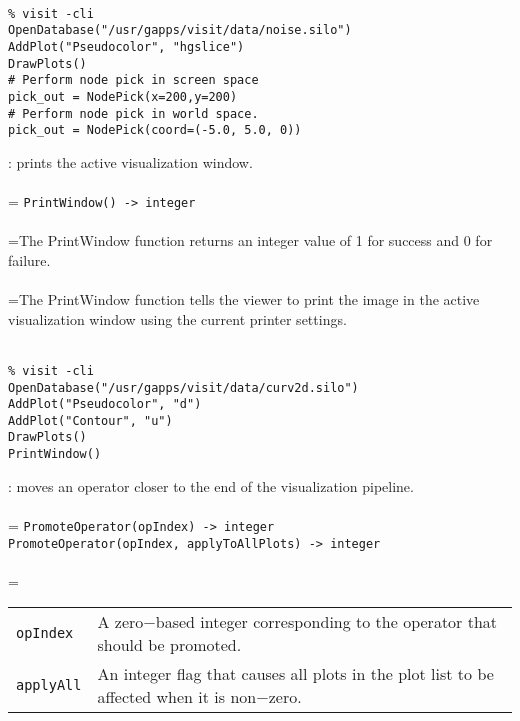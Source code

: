 \documentclass[10pt,a4paper]{report}
\begin{document}
\\[-6mm]
\begin{verbatim}% visit -cli
OpenDatabase("/usr/gapps/visit/data/noise.silo")
AddPlot("Pseudocolor", "hgslice")
DrawPlots()
# Perform node pick in screen space
pick_out = NodePick(x=200,y=200)
# Perform node pick in world space.
pick_out = NodePick(coord=(-5.0, 5.0, 0))
\end{verbatim}
\newpage


{}
: prints the active visualization window.\\[-3mm]

 \\ 
\hangindent=\parindent 
\verb!PrintWindow() -> integer!\\ [-3mm]

 \\ 
\hangindent=\parindent The PrintWindow function returns an integer value of 1 for success and 0 for failure. \\[-3mm] 

 \\ 
\hangindent=\parindent The PrintWindow function tells the viewer to print the image in the active visualization window using the current printer settings. \\[-3mm] 

\\[-6mm]
\begin{verbatim}% visit -cli
OpenDatabase("/usr/gapps/visit/data/curv2d.silo")
AddPlot("Pseudocolor", "d")
AddPlot("Contour", "u")
DrawPlots()
PrintWindow()
\end{verbatim}
\newpage


{}
: moves an operator closer to the end of the visualization pipeline.\\[-3mm]

 \\ 
\hangindent=\parindent 
\verb!PromoteOperator(opIndex) -> integer!\\ 
\verb!PromoteOperator(opIndex, applyToAllPlots) -> integer!\\ [-3mm]

 \\ 
\hangindent=\parindent 
\begin{tabular}{lp{9cm}}
\verb!opIndex! & A zero$-$based integer corresponding to the operator that should be promoted. \\
\verb!applyAll! & An integer flag that causes all plots in the plot list to be affected when it is non$-$zero. \\
\end{tabular} \\[-2mm]
\end{document}
